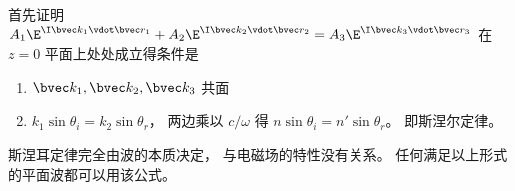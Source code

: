 


首先证明 $A_1 \E^{\I \bvec k_1 \vdot \bvec r_1} + A_2 \E^{\I \bvec k_2 \vdot \bvec r_2} = A_3 \E^{\I \bvec k_3 \vdot \bvec r_3}$ 在 $z = 0$ 平面上处处成立得条件是

\begin{enumerate}
\item $\bvec k_1, \bvec k_2, \bvec k_3$ 共面
\item $k_1 \sin \theta_i = k_2 \sin \theta_r$， 两边乘以 $c/\omega$ 得 $n \sin\theta_i = n' \sin \theta_r$。 即斯涅尔定律。
\end{enumerate}
斯涅耳定律完全由波的本质决定， 与电磁场的特性没有关系。 任何满足以上形式的平面波都可以用该公式。
